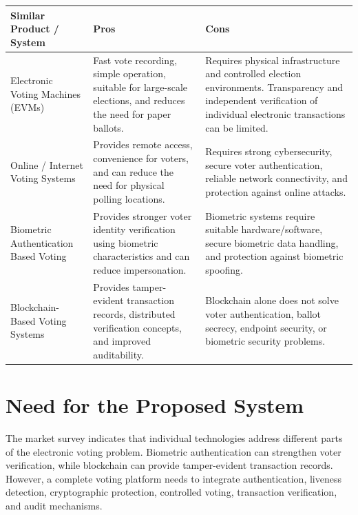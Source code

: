 \documentclass[12pt,a4paper]{report}
\begin{document}
\begin{center}
	\small
	\renewcommand{\arraystretch}{1.1}
	
	\begin{longtable}{|p{3.2cm}|p{4.7cm}|p{4.7cm}|}
		\hline
		\textbf{Similar Product / System} &
		\textbf{Pros} &
		\textbf{Cons} \\
		\hline
		
		Electronic Voting Machines (EVMs) &
		Fast vote recording, simple operation, suitable for large-scale elections, and reduces the need for paper ballots. &
		Requires physical infrastructure and controlled election environments. Transparency and independent verification of individual electronic transactions can be limited. \\
		\hline
		
		Online / Internet Voting Systems &
		Provides remote access, convenience for voters, and can reduce the need for physical polling locations. &
		Requires strong cybersecurity, secure voter authentication, reliable network connectivity, and protection against online attacks. \\
		\hline
		
		Biometric Authentication Based Voting &
		Provides stronger voter identity verification using biometric characteristics and can reduce impersonation. &
		Biometric systems require suitable hardware/software, secure biometric data handling, and protection against biometric spoofing. \\
		\hline
		
		Blockchain-Based Voting Systems &
		Provides tamper-evident transaction records, distributed verification concepts, and improved auditability. &
		Blockchain alone does not solve voter authentication, ballot secrecy, endpoint security, or biometric security problems. \\
		\hline
		
	\end{longtable}
	\normalsize
\end{center}

\section*{Need for the Proposed System}

The market survey indicates that individual technologies address different parts of the electronic voting problem. Biometric authentication can strengthen voter verification, while blockchain can provide tamper-evident transaction records. However, a complete voting platform needs to integrate authentication, liveness detection, cryptographic protection, controlled voting, transaction verification, and audit mechanisms.
\end{document}
